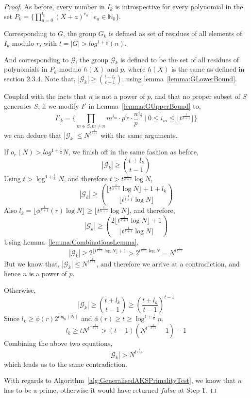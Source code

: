 \documentclass[11pt]{report}
\begin{document}
\begin{proof}
As before, every number‌ in $I_k$ is introspective for every polynomial in the set $P_k = \{\prod_{a=0}^{l_k}{(X+a)^{e_a}}\ |\ e_a \in \mathbb{N}_0\}$.

Corresponding to $G$, the group $G_k$ is defined as set of residues of all elements of $I_k$ modulo $r$, with $t = |G| > log^{1+\frac{1}{k}}(n)$.

And corresponding to $\mathcal{G}$, the group $\mathcal{G}_k$ is defined to be the set of all residues of polynomials in $P_k$ modulo $h(X)$ and $p$, where $h(X)$ is the same as defined in section $2.3.4$. Note that, $|\mathcal{G}_k| \geq {{t+l_k} \choose {t-1}}$, using lemma~\ref{lemma:GLowerBound}.

Coupled with the facts that $n$ is not a power of $p$, and that no proper subset of $S$ generates $S$; if we modify $I'$ in Lemma~\ref{lemma:GUpperBound} to,
\[I'_k = \{ \prod_{m \in S, m \neq n} m^{i_m} \cdot p^{i_p} \cdot \frac{n}{p}^{i_\frac{n}{p}}\ |\ 0 \leq i_m \leq \lfloor t^\frac{1}{k+1} \rfloor \}\]
we can deduce that $|\mathcal{G}_k| \leq N^{t^{\frac{1}{k+1}}}$ with the same arguments.

If $o_r(N) > log^{1 + \frac{1}{k}} N$, we finish off in the same fashion as before, 
\[|\mathcal{G}_k| \geq {{t+l_k} \choose {t-1}}\]
Using $t > \log^{1+\frac{1}{k}} N$, and therefore $t > t^{\frac{1}{k+1}} \log N$,
\[|\mathcal{G}_k| \geq {{{\lfloor t^{\frac{1}{k+1}} \log N \rfloor} + 1 + l_k} \choose {\lfloor t^{\frac{1}{k+1}} \log N \rfloor}}\]
Also $l_k = \lfloor \phi^\frac{1}{k+1}(r) \log N \rfloor \geq \lfloor t^{\frac{1}{k+1}} \log{N} \rfloor$, and therefore,
\[|\mathcal{G}_k| \geq {{2{\lfloor t^{\frac{1}{k+1}} \log N \rfloor}+1} \choose {\lfloor t^{\frac{1}{k+1}} \log N \rfloor}}\]
Using Lemma~\ref{lemma:CombinationsLemma},
\[|\mathcal{G}_k| \geq 2^{{\lfloor t^{\frac{1}{k+1}} \log N \rfloor}+1} > 2^{t^{\frac{1}{k+1}} \log N} = N^{t^{\frac{1}{k+1}}}\]
But we know that, $|\mathcal{G}_k| \leq N^{t^{\frac{1}{k+1}}}$, and therefore we arrive at a contradiction, and hence $n$ is a power of $p$.

Otherwise,
\[|\mathcal{G}_k| \geq {{t+l_k} \choose {t-1}} \geq (\frac{t+l_k}{t-1})^{t-1}\]
Since $l_k \geq \phi(r)2^{log_n(N)}$ and $\phi(r) \geq t \geq \log^{1 + \frac{1}{k}}n$,
\[l_k \geq tN^{t^{-\frac{k}{k+1}}} > (t-1)(N^{t^{-\frac{k}{k+1}}}-1)-1\]
Combining the above two equations,
\[|\mathcal{G}_k| > N^{t^\frac{1}{k+1}}\]
which leads us to the same contradiction.

With regards to Algorithm~\ref{alg:GeneralisedAKSPrimalityTest}, we know that $n$ has to be a prime, otherwise it would have returned $false$ at Step $1$. 
\end{proof}
\end{document}
